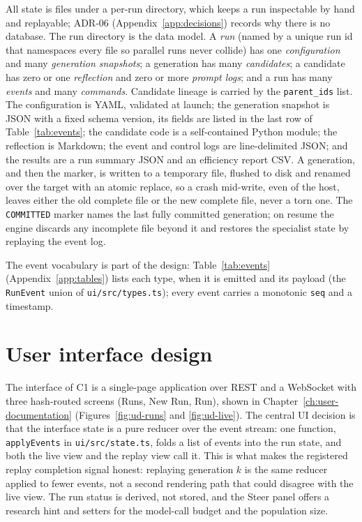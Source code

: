 All state is files under a per-run directory, which keeps a run inspectable by
hand and replayable; ADR-06 (Appendix~\ref{app:decisions}) records why there is
no database. The run directory is the data model. A \emph{run} (named by a unique run id that
namespaces every file so parallel runs never collide) has one
\emph{configuration} and many \emph{generation snapshots}; a generation has many
\emph{candidates}; a candidate has zero or one \emph{reflection} and zero or more
\emph{prompt logs}; and a run has many \emph{events} and many \emph{commands}.
Candidate lineage is carried by the \texttt{parent\_ids} list. The configuration
is YAML, validated at launch; the generation snapshot is JSON with a fixed schema
version, its fields are listed in the last row of Table~\ref{tab:events}; the candidate code is
a self-contained Python module; the reflection is Markdown; the event and control
logs are line-delimited JSON; and the results are a run summary JSON and an
efficiency report CSV. A generation, and then the marker, is written to a
temporary file, flushed to disk and renamed over the target with an atomic
replace, so a crash mid-write, even of the host, leaves either the old complete
file or the new complete file, never a torn one. The
\texttt{COMMITTED} marker names the last fully committed generation; on resume the
engine discards any incomplete file beyond it and restores the specialist state by
replaying the event log.

The event vocabulary is part of the design: Table~\ref{tab:events}
(Appendix~\ref{app:tables}) lists each type, when it is emitted and its payload
(the \texttt{RunEvent} union of \texttt{ui/src/types.ts}); every event carries
a monotonic \texttt{seq} and a timestamp.

\section{User interface design}
\label{sec:design-ui}

The interface of C1 is a single-page application over REST and a WebSocket with
three hash-routed screens (Runs, New Run, Run), shown in
Chapter~\ref{ch:user-documentation} (Figures~\ref{fig:ud-runs} and
\ref{fig:ud-live}). The central UI decision is that the interface state is a pure reducer over the
event stream: one function, \texttt{applyEvents} in \texttt{ui/src/state.ts},
folds a list of events into the run state, and both the live view and the replay
view call it. This is what makes the registered replay completion signal honest:
replaying generation $k$ is the same reducer applied to fewer events, not a
second rendering path that could disagree with the live view. The run status is
derived, not stored, and the Steer panel offers a research hint and setters for
the model-call budget and the population size.

